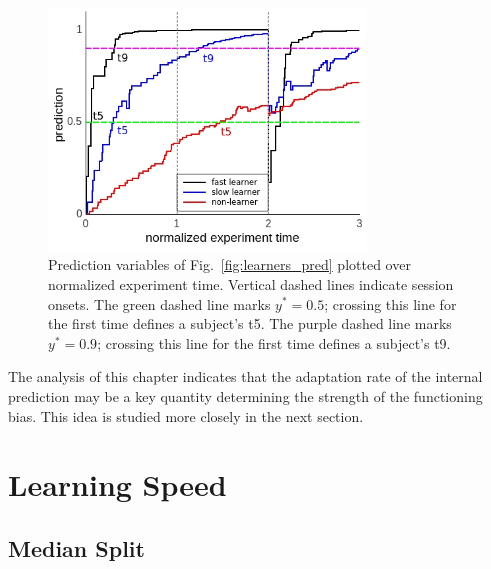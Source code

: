 \documentclass[a4paper]{scrreprt}
\begin{document}
\begin{figure}
\centering        
\includegraphics[width=0.75\textwidth]{figs/sec3/individuals_preds.jpeg}
\caption{Prediction variables of Fig.~\ref{fig:learners_pred} plotted over normalized experiment time. Vertical dashed lines indicate session onsets. The green dashed line marks $y^*=0.5$; crossing this line for the first time defines a subject's t5. The purple dashed line marks $y^*=0.9$; crossing this line for the first time defines a subject's t9.}
\label{fig:ind_preds}
\end{figure}

The analysis of this chapter indicates that the adaptation rate of the internal prediction may be a key quantity determining the strength of the functioning bias. This idea is studied more closely in the next section.


\section{Learning Speed}
\label{sec:learning_speed}

\subsection{Median Split}
\label{sec:learning_speed_median_split}
\end{document}
